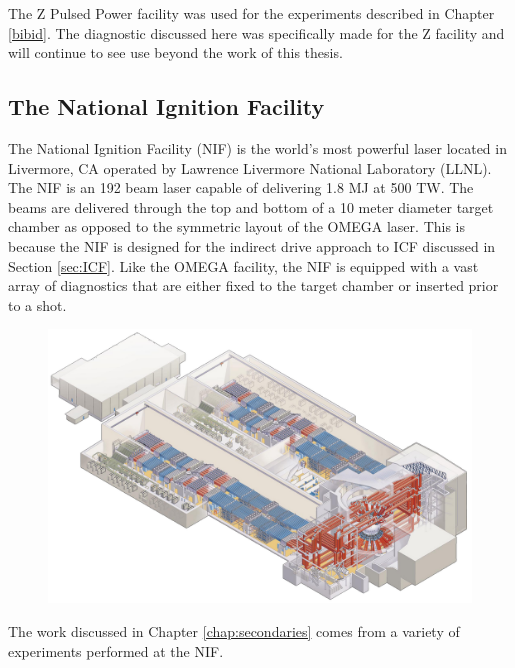 The Z Pulsed Power facility was used for the experiments described in Chapter \ref{bibid}. The diagnostic discussed here was specifically made for the Z facility and will continue to see use beyond the work of this thesis. 





\subsection{The National Ignition Facility}
\label{sec:NIF}

The National Ignition Facility (NIF) is the world's most powerful laser located in Livermore, CA operated by Lawrence Livermore National Laboratory (LLNL). The NIF is an 192 beam laser capable of delivering 1.8 MJ at 500 TW. The beams are delivered through the top and bottom of a 10 meter diameter target chamber as opposed to the symmetric layout of the OMEGA laser. This is because the NIF is designed for the indirect drive approach to ICF discussed in Section \ref{sec:ICF}. Like the OMEGA facility, the NIF is equipped with a vast array of diagnostics that are either fixed to the target chamber or inserted prior to a shot.  

\begin{figure}[h!]
	\centering
	\includegraphics[scale=0.3]{Figures/theNIF.pdf}
	\caption{ \cite{bibid}}
\end{figure}

The work discussed in Chapter \ref{chap:secondaries} comes from a variety of experiments performed at the NIF. 



